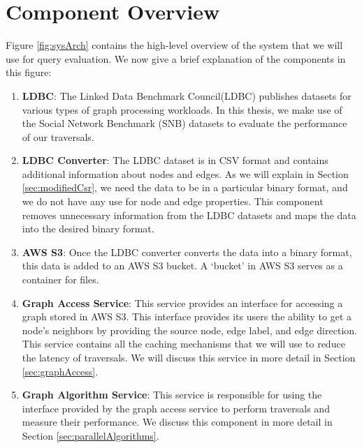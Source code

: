 \section{Component Overview}\label{sec:componentOverview}
Figure \ref{fig:sysArch} contains the high-level overview of the system that
we will use for query evaluation. We now give a brief explanation of the
components in this figure:
\begin{enumerate}
    \item \textbf{LDBC}: The Linked Data Benchmark Council(LDBC) publishes datasets
        for various types of graph processing workloads. In this thesis, we make
        use of the Social Network Benchmark (SNB) datasets to evaluate
        the performance of our traversals.
    \item \textbf{LDBC Converter}: The LDBC dataset is in CSV format and
        contains additional information about nodes and edges. As we will explain
        in Section \ref{sec:modifiedCsr}, we need the data to be in a particular
        binary format, and we do not have any use for node and edge properties.
        This component removes unnecessary information from
        the LDBC datasets and maps the data into the desired binary format.
    \item \textbf{AWS S3}: Once the LDBC converter converts the data into a
        binary format, this data is added to an AWS S3 bucket. A `bucket' in
        AWS S3 serves as a container for files.
    \item \textbf{Graph Access Service}: This service provides an interface for
        accessing a graph stored in AWS S3. This interface provides its users
        the ability to get a node's neighbors by providing
        the source node, edge label, and edge direction. This service contains
        all the caching mechanisms that we will use to reduce the latency of
        traversals. We will discuss this service in more detail in
        Section \ref{sec:graphAccess}.
    \item \textbf{Graph Algorithm Service}: This service is responsible for
        using the interface provided by the graph access service to perform
        traversals and measure their performance. We discuss this component in
        more detail in Section \ref{sec:parallelAlgorithms}.
\end{enumerate}

